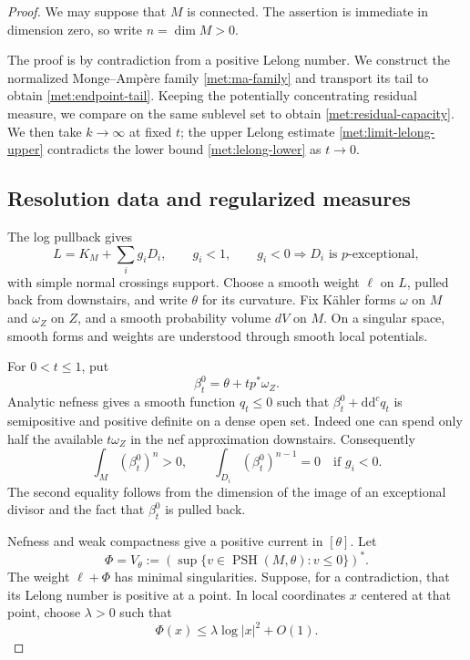 \documentclass[11pt,letterpaper]{article}
\theoremstyle{definition}
\theoremstyle{remark}
\begin{document}
\begin{proof}
We may suppose that \(M\) is connected.  The assertion is immediate in
dimension zero, so write \(n=\dim M>0\).

The proof is by contradiction from a positive Lelong number. We construct
the normalized Monge--Amp\`ere family \eqref{met:ma-family} and transport
its tail to obtain \eqref{met:endpoint-tail}. Keeping the potentially
concentrating residual measure, we compare on the same sublevel set to
obtain \eqref{met:residual-capacity}. We then take \(k\to\infty\) at
fixed \(t\); the upper Lelong estimate \eqref{met:limit-lelong-upper}
contradicts the lower bound \eqref{met:lelong-lower} as \(t\to0\).

\subsection*{Resolution data and regularized measures}

The log pullback gives
\begin{equation}
 \label{met:adjoint-data}
 L=K_M+\sum_i g_iD_i,
 \qquad g_i<1,
 \qquad g_i<0\Longrightarrow D_i\text{ is }p\text{-exceptional},
\end{equation}
with simple normal crossings support.  Choose a smooth weight \(\ell\)
on \(L\), pulled back from downstairs, and write \(\theta\) for its
curvature.  Fix K\"ahler forms \(\omega\) on \(M\) and \(\omega_Z\) on
\(Z\), and a smooth probability volume \(dV\) on \(M\).  On a singular
space, smooth forms and weights are understood through smooth local
potentials.

For \(0<t\leq1\), put
\begin{equation}
 \label{met:beta-zero}
 \beta_t^0=\theta+t p^*\omega_Z.
\end{equation}
Analytic nefness gives a smooth function \(q_t\leq0\) such that
\(\beta_t^0+\mathrm{d}\mathrm{d}^{c} q_t\) is semipositive and positive definite on a dense
open set.  Indeed one can spend only half the available \(t\omega_Z\)
in the nef approximation downstairs.  Consequently
\begin{equation}
 \label{met:exceptional-degree}
 \int_M(\beta_t^0)^n>0,
 \qquad
 \int_{D_i}(\beta_t^0)^{n-1}=0\quad\text{if }g_i<0.
\end{equation}
The second equality follows from the dimension of the image of an
exceptional divisor and the fact that \(\beta_t^0\) is pulled back.

Nefness and weak compactness give a positive current in \([\theta]\).
Let
\begin{equation}
 \label{met:minimal-envelope}
 \Phi=V_\theta
 :=\left(\sup\{v\in\operatorname{PSH}(M,\theta):v\leq0\}\right)^*.
\end{equation}
The weight \(\ell+\Phi\) has minimal singularities.  Suppose, for a
contradiction, that its Lelong number is positive at a point.  In local
coordinates \(x\) centered at that point, choose \(\lambda>0\) such that
\begin{equation}
 \label{met:assumed-pole}
 \Phi(x)\leq\lambda\log|x|^2+O(1).
\end{equation}


\end{proof}
\end{document}
